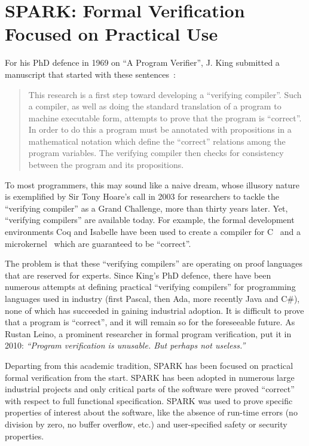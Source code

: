 \documentclass{llncs}
\begin{document}
\section{SPARK: Formal Verification Focused on Practical Use}

For his PhD defence in 1969 on ``A Program Verifier'', J. King submitted a
manuscript that started with these sentences~\cite{King1970PhD}:

\begin{quote}
This research is a first step toward developing a ``verifying compiler''. Such
a compiler, as well as doing the standard translation of a program to machine
executable form, attempts to prove that the program is ``correct''. In order to
do this a program must be annotated with propositions in a mathematical
notation which define the ``correct'' relations among the program
variables. The verifying compiler then checks for consistency between the
program and its propositions.
\end{quote}

To most programmers, this may sound like a naive dream, whose illusory nature
is exemplified by Sir Tony Hoare’s call in 2003 for researchers to tackle the
``verifying compiler'' as a Grand Challenge, more than thirty years later. Yet,
``verifying compilers'' are available today. For example, the formal
development environments Coq and Isabelle have been used to create a compiler
for C~\cite{Leroy-backend} and a microkernel~\cite{Klein2009SOSP} which are
guaranteed to be ``correct''.

The problem is that these ``verifying compilers'' are operating on proof
languages that are reserved for experts. Since King's PhD defence, there have
been numerous attempts at defining practical ``verifying compilers'' for
programming languages used in industry (first Pascal, then Ada, more recently
Java and C\#), none of which has succeeded in gaining industrial adoption. It
is difficult to prove that a program is ``correct'', and it will remain so for
the foreseeable future. As Rustan Leino, a prominent researcher in formal
program verification, put it in 2010: \textit{``Program verification is
  unusable. But perhaps not useless.''}~\cite{Leino10usableauto-active}

Departing from this academic tradition, SPARK has been focused on practical
formal verification from the start. SPARK has been adopted in numerous large
industrial projects and only critical parts of the software were proved
``correct'' with respect to full functional specification. SPARK was used to
prove specific properties of interest about the software, like the absence of
run-time errors (no division by zero, no buffer overflow, etc.) and
user-specified safety or security properties.
\end{document}
